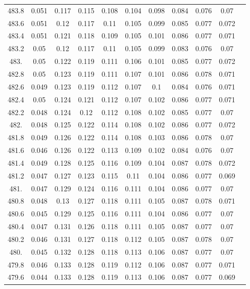 \documentclass[12pt]{ctexart}
\numberwithin{equation}{section}
\begin{document}
\begin{longtable}{ccccccccccc}
483.8	&	0.051	&	0.117	&	0.115	&	0.108	&	0.104	&	0.098	&	0.084	&	0.076	&	0.07	\\
483.6	&	0.051	&	0.12	&	0.117	&	0.11	&	0.105	&	0.099	&	0.085	&	0.077	&	0.072	\\
483.4	&	0.051	&	0.121	&	0.118	&	0.109	&	0.105	&	0.101	&	0.086	&	0.077	&	0.071	\\
483.2	&	0.05	&	0.12	&	0.117	&	0.11	&	0.105	&	0.099	&	0.083	&	0.076	&	0.07	\\
483.	&	0.05	&	0.122	&	0.119	&	0.111	&	0.106	&	0.101	&	0.085	&	0.077	&	0.072	\\
482.8	&	0.05	&	0.123	&	0.119	&	0.111	&	0.107	&	0.101	&	0.086	&	0.078	&	0.071	\\
482.6	&	0.049	&	0.123	&	0.119	&	0.112	&	0.107	&	0.1	&	0.084	&	0.076	&	0.071	\\
482.4	&	0.05	&	0.124	&	0.121	&	0.112	&	0.107	&	0.102	&	0.086	&	0.077	&	0.071	\\
482.2	&	0.048	&	0.124	&	0.12	&	0.112	&	0.108	&	0.102	&	0.085	&	0.077	&	0.07	\\
482.	&	0.048	&	0.125	&	0.122	&	0.114	&	0.108	&	0.102	&	0.086	&	0.077	&	0.072	\\
481.8	&	0.049	&	0.126	&	0.122	&	0.114	&	0.108	&	0.103	&	0.086	&	0.078	&	0.07	\\
481.6	&	0.046	&	0.126	&	0.122	&	0.113	&	0.109	&	0.102	&	0.084	&	0.076	&	0.07	\\
481.4	&	0.049	&	0.128	&	0.125	&	0.116	&	0.109	&	0.104	&	0.087	&	0.078	&	0.072	\\
481.2	&	0.047	&	0.127	&	0.123	&	0.115	&	0.11	&	0.104	&	0.086	&	0.077	&	0.069	\\
481.	&	0.047	&	0.129	&	0.124	&	0.116	&	0.111	&	0.104	&	0.086	&	0.077	&	0.07	\\
480.8	&	0.048	&	0.13	&	0.127	&	0.118	&	0.111	&	0.105	&	0.087	&	0.078	&	0.071	\\
480.6	&	0.045	&	0.129	&	0.125	&	0.116	&	0.111	&	0.104	&	0.086	&	0.077	&	0.07	\\
480.4	&	0.047	&	0.131	&	0.126	&	0.118	&	0.111	&	0.105	&	0.087	&	0.077	&	0.07	\\
480.2	&	0.046	&	0.131	&	0.127	&	0.118	&	0.112	&	0.105	&	0.087	&	0.078	&	0.07	\\
480.	&	0.045	&	0.132	&	0.128	&	0.118	&	0.113	&	0.106	&	0.087	&	0.077	&	0.07	\\
479.8	&	0.046	&	0.133	&	0.128	&	0.119	&	0.112	&	0.106	&	0.087	&	0.077	&	0.071	\\
479.6	&	0.044	&	0.133	&	0.128	&	0.119	&	0.113	&	0.106	&	0.087	&	0.077	&	0.069	\\

\end{longtable}
\end{document}
